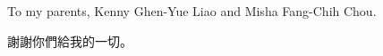 
\cleardoublepage

\begin{dedication}
  \vspace{4cm}
  \begin{center}
    To my parents, Kenny Ghen-Yue Liao and Misha Fang-Chih Chou. 
    
    \begin{CJK*}{UTF8}{bsmi}
      謝謝你們給我的一切。
    \end{CJK*}
  \end{center}
\end{dedication}
